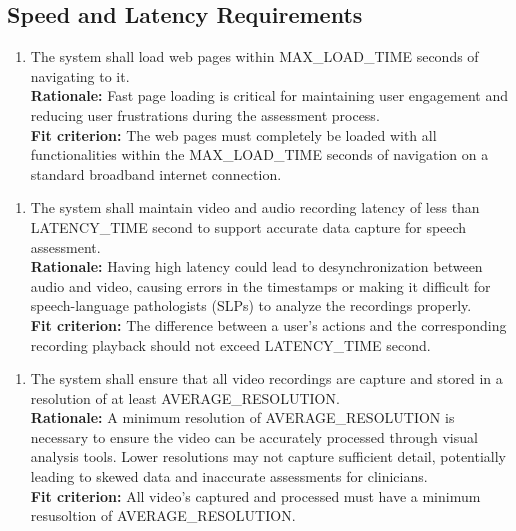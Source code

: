 \documentclass[12pt]{article}
\begin{document}
\subsection{Speed and Latency Requirements}
\begin{enumerate}[label={PR-SL}1. ]
  \item The system shall load web pages within MAX\_LOAD\_TIME seconds of navigating to it.\\
  \textbf{Rationale: }Fast page loading is critical for maintaining user engagement and reducing user frustrations during the assessment process.\\
  \textbf{Fit criterion: }The web pages must completely be loaded with all functionalities within the MAX\_LOAD\_TIME seconds of navigation on a standard broadband internet connection.  
\end{enumerate}
\begin{enumerate}[label={PR-SL}2. ]
  \item The system shall maintain video and audio recording latency of less than LATENCY\_TIME second to support accurate data capture for speech assessment.\\
  \textbf{Rationale: }Having high latency could lead to desynchronization between audio and video, causing errors in the timestamps or making it difficult for speech-language pathologists (SLPs) to analyze the recordings properly.\\
  \textbf{Fit criterion: }The difference between a user's actions and the corresponding recording playback should not exceed LATENCY\_TIME second.  
\end{enumerate}
\begin{enumerate}[label={PR-SL}3. ]
  \item The system shall ensure that all video recordings are capture and stored in a resolution of at least AVERAGE\_RESOLUTION.\\
  \textbf{Rationale: }A minimum resolution of AVERAGE\_RESOLUTION is necessary to ensure the video can be accurately processed through visual analysis tools. Lower resolutions may not capture sufficient detail, potentially leading to skewed data and inaccurate assessments for clinicians.\\
  \textbf{Fit criterion: }All video's captured and processed must have a minimum resusoltion of AVERAGE\_RESOLUTION.
\end{enumerate}
\end{document}
